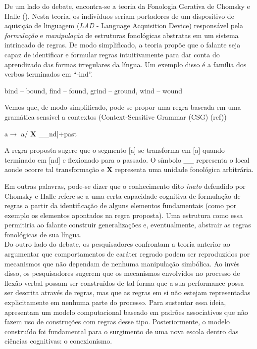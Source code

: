 

De um lado do debate, encontra-se a teoria da Fonologia Gerativa de Chomsky e Halle (\citeyear{chomsky:1968}). Nesta teoria, os indivíduos seriam portadores de um dispositivo de aquisição de linguagem (\textit{LAD} - Language Acquisition Device) responsável pela \textit{formulação} e \textit{manipulação} de estruturas fonológicas abstratas em um sistema intrincado de regras. De modo simplificado, a teoria propõe que o falante seja capaz de identificar e formular regras intuitivamente para dar conta do aprendizado das formas irregulares da língua. Um exemplo disso é a família dos verbos terminados em “-ind”.

\begin{center}
bind – bound, find – found, grind – ground, wind – wound
\end{center}

Vemos que, de modo simplificado, pode-se propor uma regra baseada em uma gramática sensível a contextos (Context-Sensitive Grammar (CSG) (ref)) 

\begin{center}
a\textsci $\rightarrow$ a\textupsilon / \textbf{X}  \_\_nd]+past
\end{center}

A regra proposta sugere que o segmento [a\textsci] se transforma em [a\textupsilon] quando terminado em [nd] e flexionado para o passado. O símbolo \_\_ representa o local aonde ocorre tal transformação e \textbf{X} representa uma unidade fonológica arbitrária. 

Em outras palavras, pode-se dizer que o conhecimento dito \textit{inato} defendido por Chomsky e Halle refere-se a uma certa capacidade cognitiva de formulação de regras a partir da identificação de alguns elementos fundamentais (como por exemplo os elementos apontados na regra proposta). Uma estrutura como essa permitiria ao falante construir generalizações e, eventualmente, abstrair as regras fonológicas de sua língua. \\

Do outro lado do debate, os pesquisadores \cite{rumelhart:1986} confrontam a teoria anterior ao argumentar que comportamentos de caráter regrado podem ser reproduzidos por mecanismos que não dependam de nenhuma manipulação simbólica. Ao invés disso, os pesquisadores sugerem que os mecanismos envolvidos no processo de flexão verbal possam ser construídos de tal forma que a sua performance possa ser descrita através de regras, mas que as regras em si não estejam representadas explicitamente em nenhuma parte do processo. Para sustentar essa ideia, \cite{rumelhart:1986} apresentam um modelo computacional baseado em padrões associativos que não fazem uso de construções com regras desse tipo. Posteriormente, o modelo construído foi fundamental para o surgimento de uma nova escola dentro das ciências cognitivas: o conexionismo.\\


